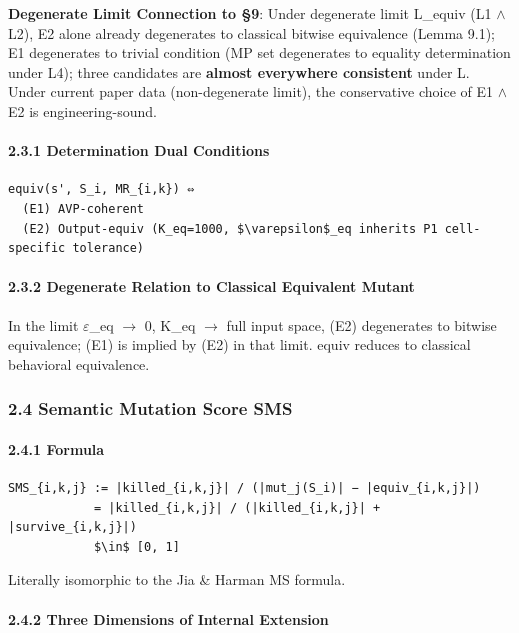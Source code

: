\documentclass[review,12pt,authoryear]{elsarticle}
\begin{document}
\textbf{Degenerate Limit Connection to §9}: Under degenerate limit
L\_equiv (L1 $\wedge$ L2), E2 alone already degenerates to classical bitwise
equivalence (Lemma 9.1); E1 degenerates to trivial condition (MP set
degenerates to equality determination under L4); three candidates are
\textbf{almost everywhere consistent} under L. Under current paper data
(non-degenerate limit), the conservative choice of E1 $\wedge$ E2 is
engineering-sound.

\paragraph{2.3.1 Determination Dual
Conditions}\label{determination-dual-conditions}

\begin{verbatim}
equiv(s', S_i, MR_{i,k}) ⇔
  (E1) AVP-coherent
  (E2) Output-equiv (K_eq=1000, $\varepsilon$_eq inherits P1 cell-specific tolerance)
\end{verbatim}

\paragraph{2.3.2 Degenerate Relation to Classical Equivalent
Mutant}\label{degenerate-relation-to-classical-equivalent-mutant}

In the limit $\varepsilon$\_eq $\to$ 0, K\_eq $\to$ full input space, (E2) degenerates to
bitwise equivalence; (E1) is implied by (E2) in that limit. equiv
reduces to classical behavioral equivalence.

\subsubsection{2.4 Semantic Mutation Score
SMS}\label{semantic-mutation-score-sms}

\paragraph{2.4.1 Formula}\label{formula}

\begin{verbatim}
SMS_{i,k,j} := |killed_{i,k,j}| / (|mut_j(S_i)| − |equiv_{i,k,j}|)
            = |killed_{i,k,j}| / (|killed_{i,k,j}| + |survive_{i,k,j}|)
            $\in$ [0, 1]
\end{verbatim}

Literally isomorphic to the Jia \& Harman MS formula.

\paragraph{2.4.2 Three Dimensions of Internal
Extension}\label{three-dimensions-of-internal-extension}
\end{document}
